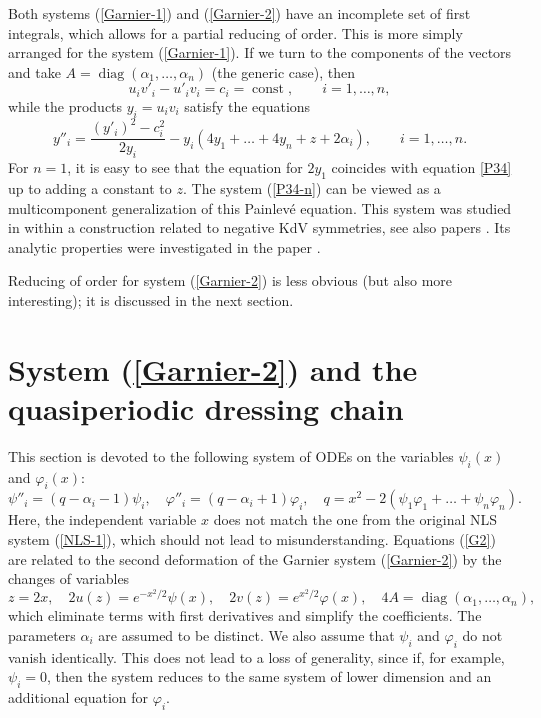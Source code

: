 \documentclass[11pt]{article}
\theoremstyle{plain}
\theoremstyle{definition}
\begin{document}
Both systems (\ref{Garnier-1}) and (\ref{Garnier-2}) have an incomplete set of first integrals, which allows for a partial reducing of order. This is more simply arranged for the system (\ref{Garnier-1}). If we turn to the components of the vectors and take $A=\operatorname{diag}(\alpha_1,\dots,\alpha_n)$ (the generic case), then
\[
 u_iv'_i-u'_iv_i=c_i=\operatorname{const},\qquad i=1,\dots,n,
\]
while the products $y_i=u_iv_i$ satisfy the equations
\begin{equation}\label{P34-n}
 y''_i=\frac{(y'_i)^2-c^2_i}{2y_i}-y_i(4y_1+\dots+4y_n+z+2\alpha_i),\qquad i=1,\dots,n.
\end{equation} 
For $n=1$, it is easy to see that the equation for $2y_1$ coincides with equation \ref{P34} up to adding a constant to $z$. The system (\ref{P34-n}) can be viewed as a multicomponent generalization of this Painlev\'e equation. This system was studied in \cite{Adler_Kolesnikov_2023} within a construction related to negative KdV symmetries, see also papers \cite{Antonowicz_Rauch-Wojciechowski_1990, Orlov_Rauch-Wojciechowski_1993}. Its analytic properties were investigated in the paper \cite{Domrin_Suleimanov_2025}.

Reducing of order for system (\ref{Garnier-2}) is less obvious (but also more interesting); it is discussed in the next section.

\section{System (\ref{Garnier-2}) and the quasiperiodic dressing chain}\label{s:dc}

This section is devoted to the following system of ODEs on the variables $\psi_i(x)$ and $\varphi_i(x)$:
\begin{equation}\label{G2}
 \psi''_i=(q-\alpha_i-1)\psi_i,\quad
 \varphi''_i=(q-\alpha_i+1)\varphi_i,\quad
 q=x^2-2(\psi_1\varphi_1+\dots+\psi_n\varphi_n).
\end{equation}
Here, the independent variable $x$ does not match the one from the original NLS system (\ref{NLS-1}), which should not lead to misunderstanding. Equations (\ref{G2}) are related to the second deformation of the Garnier system (\ref{Garnier-2}) by the changes of variables
\[
 z=2x,\quad 2u(z)=e^{-x^2/2}\psi(x),\quad 2v(z)=e^{x^2/2}\varphi(x),\quad 
 4A=\operatorname{diag}(\alpha_1,\dots,\alpha_n),
\]
which eliminate terms with first derivatives and simplify the coefficients. The parameters $\alpha_i$ are assumed to be distinct. We also assume that $\psi_i$ and $\varphi_i$ do not vanish identically. This does not lead to a loss of generality, since if, for example, $\psi_i=0$, then the system reduces to the same system of lower dimension and an additional equation for $\varphi_i$.
 
\end{document}
